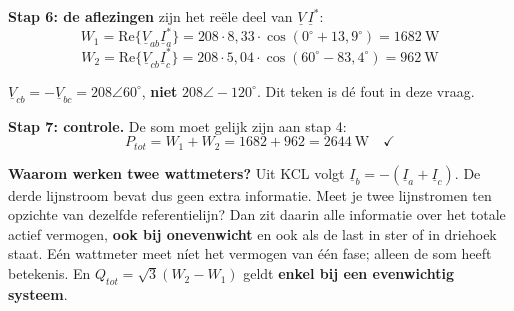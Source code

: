 \documentclass[a4paper,11pt]{article}
\begin{document}
\begin{oefenblok}
    \textbf{Stap 6: de aflezingen} zijn het reële deel van $\underline{V}\,\underline{I}^{*}$:
    \[W_1 = \text{Re}\{\underline{V}_{ab}\underline{I}_a^{*}\} = 208 \cdot 8{,}33 \cdot \cos(0^\circ + 13{,}9^\circ) = \boxed{1682\ \text{W}}\]
    \[W_2 = \text{Re}\{\underline{V}_{cb}\underline{I}_c^{*}\} = 208 \cdot 5{,}04 \cdot \cos(60^\circ - 83{,}4^\circ) = \boxed{962\ \text{W}}\]

    \begin{waarschuwing}
        $\underline{V}_{cb} = -\underline{V}_{bc} = 208\angle 60^\circ$, \textbf{niet}
        $208\angle -120^\circ$. Dit teken is dé fout in deze vraag.
    \end{waarschuwing}

    \textbf{Stap 7: controle.} De som moet gelijk zijn aan stap 4:
    \[P_{tot} = W_1 + W_2 = 1682 + 962 = 2644\ \text{W} \quad\checkmark\]

    \textbf{Waarom werken twee wattmeters?} Uit KCL volgt
    $\underline{I}_b = -(\underline{I}_a + \underline{I}_c)$. De derde lijnstroom bevat dus geen
    extra informatie. Meet je twee lijnstromen ten opzichte van dezelfde referentielijn? Dan zit
    daarin alle informatie over het totale actief vermogen, \textbf{ook bij onevenwicht} en ook als
    de last in ster of in driehoek staat. Eén wattmeter meet níet het vermogen van één
    fase; alleen de som heeft betekenis. En $Q_{tot} = \sqrt{3}(W_2 - W_1)$ geldt \textbf{enkel bij
        een evenwichtig systeem}.
\end{oefenblok}
\end{document}
